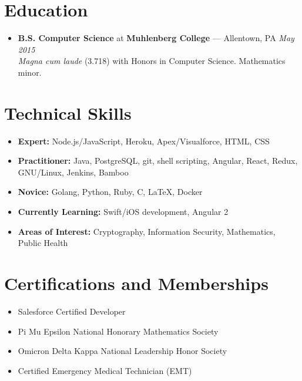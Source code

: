 \documentclass[11pt]{article}
\begin{document}
\section*{Education}
\begin{itemize}
  \item \textbf{B.S. Computer Science} at \textbf{Muhlenberg College} --- Allentown, PA \hfill {\em May 2015} \\
  {\em Magna cum laude} (3.718) with Honors in Computer Science. Mathematics minor.
\end{itemize}



\section*{Technical Skills}
\begin{itemize}
  \item \textbf{Expert:} Node.js/JavaScript, Heroku, Apex/Visualforce, HTML, CSS
  \item \textbf{Practitioner:} Java, PostgreSQL, git, shell scripting, Angular, React, Redux, GNU/Linux, Jenkins, Bamboo
  \item \textbf{Novice:} Golang, Python, Ruby, C, LaTeX, Docker
  \item \textbf{Currently Learning:} Swift/iOS development, Angular 2
  \item \textbf{Areas of Interest:} Cryptography, Information Security, Mathematics, Public Health
\end{itemize}



\section*{Certifications and Memberships}
\begin{itemize}
  \item Salesforce Certified Developer
  \item Pi Mu Epsilon National Honorary Mathematics Society
  \item Omicron Delta Kappa National Leadership Honor Society
  \item Certified Emergency Medical Technician (EMT)
\end{itemize}
\end{document}
